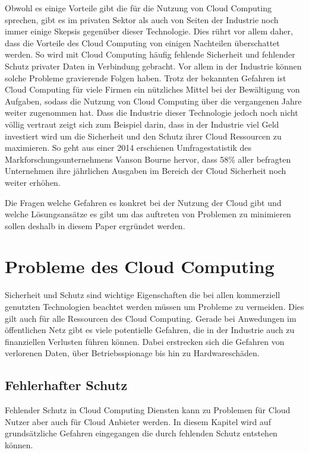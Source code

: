 Obwohl es einige Vorteile gibt die für die Nutzung von Cloud Computing sprechen, gibt es im privaten Sektor als auch von Seiten der Industrie noch immer einige Skepsis gegenüber dieser Technologie. Dies rührt vor allem daher, dass die Vorteile des Cloud Computing von einigen Nachteilen überschattet werden. So wird mit Cloud Computing häufig fehlende Sicherheit und fehlender Schutz privater Daten in Verbindung gebracht. Vor allem in der Industrie können solche Probleme gravierende Folgen haben. 
Trotz der bekannten Gefahren ist Cloud Computing für viele Firmen ein nützliches Mittel bei der Bewältigung von Aufgaben, sodass die Nutzung von Cloud Computing über die vergangenen Jahre weiter zugenommen hat.
Dass die Industrie dieser Technologie jedoch noch nicht völlig vertraut zeigt sich zum Beispiel darin, dass in der Industrie viel Geld investiert wird um die Sicherheit und den Schutz ihrer Cloud Ressourcen zu maximieren. So geht aus einer 2014 erschienen Umfragestatistik des Markforschungsunternehmens Vanson Bourne \cite{vansonbourne2014} hervor, dass 58\% aller befragten Unternehmen ihre jährlichen Ausgaben im Bereich der Cloud Sicherheit noch weiter erhöhen.

Die Fragen welche Gefahren es konkret bei der Nutzung der Cloud gibt und welche Lösungsansätze es gibt um das auftreten von Problemen zu minimieren sollen deshalb in diesem Paper ergründet werden.

\section{Probleme des Cloud Computing}
Sicherheit und Schutz sind wichtige Eigenschaften die bei allen kommerziell genutzten Technologien beachtet werden müssen um Probleme zu vermeiden. Dies gilt auch für alle Ressourcen des Cloud Computing. Gerade bei Anwedungen im öffentlichen Netz gibt es viele potentielle Gefahren, die in der Industrie auch zu finanziellen Verlusten führen können. 
Dabei erstrecken sich die Gefahren von verlorenen Daten, über Betriebsspionage bis hin zu Hardwareschäden. 

\subsection{Fehlerhafter Schutz}
\label{sec:fehlender-Schutz}
Fehlender Schutz in Cloud Computing Diensten kann zu Problemen für Cloud Nutzer aber auch für Cloud Anbieter werden. In diesem Kapitel wird auf grundsätzliche Gefahren eingegangen die durch fehlenden Schutz entstehen können.

